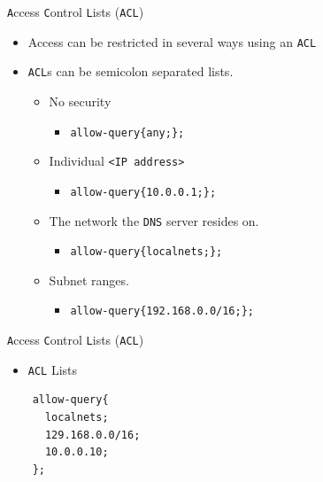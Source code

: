 \documentclass[aspectratio=169,xcolor=table]{beamer}
\begin{document}
\begin{frame}{\texttt{A}ccess \texttt{C}ontrol \texttt{L}ists (\texttt{ACL})}
  \begin{itemize}
    \item Access can be restricted in several ways using an \texttt{ACL}
    \item \texttt{ACL}s can be semicolon separated lists.
      \begin{itemize}
        \item No security
          \begin{itemize}
            \item \texttt{allow-query\{any;\};}
          \end{itemize}
        \item Individual \texttt{<IP address>}
          \begin{itemize}
            \item \texttt{allow-query\{10.0.0.1;\};}
          \end{itemize}
        \item The network the \texttt{DNS} server resides on.
          \begin{itemize}
            \item \texttt{allow-query\{localnets;\};}
          \end{itemize}
        \item Subnet ranges.
          \begin{itemize}
            \item \texttt{allow-query\{192.168.0.0/16;\};}
          \end{itemize}
        \end{itemize}
  \end{itemize}
\end{frame}

\begin{frame}[fragile]{\texttt{A}ccess \texttt{C}ontrol \texttt{L}ists (\texttt{ACL})}
  \begin{itemize}
    \item \texttt{ACL} Lists
  \end{itemize}
  \lstset{
    basicstyle=\small\ttfamily,
  }
  \begin{lstlisting}
    allow-query{
      localnets;
      129.168.0.0/16;
      10.0.0.10;
    };
  \end{lstlisting}
\end{frame}
\end{document}
